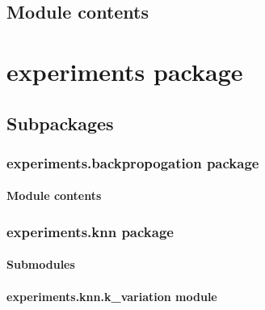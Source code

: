 \documentclass[letterpaper,10pt,english]{sphinxmanual}
\begin{document}
\section{Module contents}
\label{\detokenize{classifiers:module-classifiers}}\label{\detokenize{classifiers:module-contents}}

\chapter{experiments package}
\label{\detokenize{experiments:experiments-package}}\label{\detokenize{experiments::doc}}

\section{Subpackages}
\label{\detokenize{experiments:subpackages}}

\subsection{experiments.backpropogation package}
\label{\detokenize{experiments.backpropogation:experiments-backpropogation-package}}\label{\detokenize{experiments.backpropogation::doc}}

\subsubsection{Module contents}
\label{\detokenize{experiments.backpropogation:module-experiments.backpropogation}}\label{\detokenize{experiments.backpropogation:module-contents}}

\subsection{experiments.knn package}
\label{\detokenize{experiments.knn:experiments-knn-package}}\label{\detokenize{experiments.knn::doc}}

\subsubsection{Submodules}
\label{\detokenize{experiments.knn:submodules}}

\subsubsection{experiments.knn.k\_variation module}
\label{\detokenize{experiments.knn:experiments-knn-k-variation-module}}\label{\detokenize{experiments.knn:module-experiments.knn.k_variation}}
\end{document}
